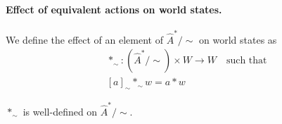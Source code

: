 \paragraph{Effect of equivalent actions on world states.}
We define the effect of an element of  $\hat{A}^{\ast}/\sim$ on world states as
\begin{equation}
	\begin{aligned}
		 & \ast_{\sim}: (\hat{A}^{\ast}/\sim) \times W \to W \quad \text{such that} \\
		 & [a]_{\sim} \ast_{\sim} w = a \ast w
	\end{aligned}
\end{equation}

\begin{proposition}
	$\ast_{\sim}$ is well-defined on $\hat{A}^{\ast}/\sim$.
\end{proposition}
